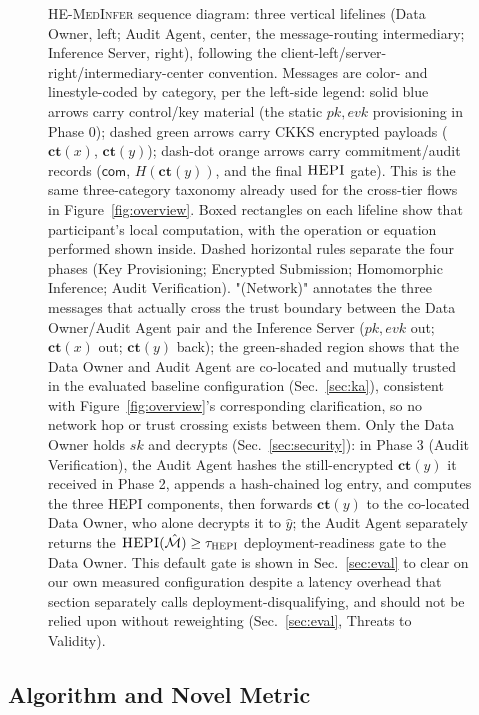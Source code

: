 \documentclass[journal,compsoc]{IEEEtran}
\newcommand{\HEPI}{\textsc{HEPI}}          %
\newcommand{\framework}{\textsc{HE-MedInfer}}
\newcommand{\Mod}{\mathcal{M}}
\begin{document}
\begin{figure}[!t]
\caption{\framework{} sequence diagram: three vertical lifelines (Data
Owner, left; Audit Agent, center, the message-routing intermediary; Inference
Server, right), following the client-left/server-right/intermediary-center
convention. Messages are color- and linestyle-coded by category, per the
left-side legend: solid blue arrows carry control/key material (the static
$pk,evk$ provisioning in Phase 0); dashed green arrows carry CKKS encrypted
payloads ($\mathbf{ct}(x)$, $\mathbf{ct}(y)$); dash-dot orange arrows carry
commitment/audit records ($\mathsf{com}$, $H(\mathbf{ct}(y))$, and the final
$\HEPI$ gate). This is the same three-category taxonomy already used for the
cross-tier flows in Figure~\ref{fig:overview}. Boxed rectangles on each
lifeline show that participant's local computation, with the operation or
equation performed shown inside. Dashed horizontal rules separate the four
phases (Key Provisioning; Encrypted Submission; Homomorphic Inference;
Audit Verification). "(Network)" annotates the three messages that actually
cross the trust boundary between the Data Owner/Audit Agent pair and the
Inference Server ($pk,evk$ out; $\mathbf{ct}(x)$ out; $\mathbf{ct}(y)$ back);
the green-shaded region shows that the Data Owner and Audit Agent are
co-located and mutually trusted in the evaluated baseline configuration
(Sec.~\ref{sec:ka}), consistent with Figure~\ref{fig:overview}'s
corresponding clarification, so no network hop or trust crossing exists
between them. Only the Data Owner holds $sk$ and decrypts
(Sec.~\ref{sec:security}): in Phase 3 (Audit Verification), the Audit Agent
hashes the still-encrypted $\mathbf{ct}(y)$ it received in Phase 2, appends
a hash-chained log entry, and computes the three \HEPI{} components, then
forwards $\mathbf{ct}(y)$ to the co-located Data Owner, who alone decrypts
it to $\hat{y}$; the Audit Agent separately returns the
$\HEPI(\hat{\Mod}) \geq \tau_{\HEPI}$ deployment-readiness gate to the Data
Owner. This default gate is shown in
Sec.~\ref{sec:eval} to clear on our own measured
configuration despite a latency overhead that section separately calls
deployment-disqualifying, and should not be relied upon without
reweighting (Sec.~\ref{sec:eval}, Threats to Validity).}
\label{fig:sequence}

\end{figure}

\subsection{Algorithm and Novel Metric}
\end{document}
